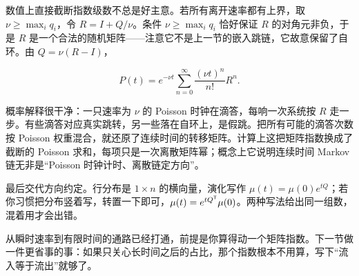 数值上直接截断指数级数不总是好主意。若所有离开速率都有上界，取 \(\nu\ge\max_i q_i\)，令 \(R=I+Q/\nu\)。条件 \(\nu\ge\max_i q_i\) 恰好保证 \(R\) 的对角元非负，于是 \(R\) 是一个合法的随机矩阵——注意它不是上一节的嵌入跳链，它故意保留了自环。由 \(Q=\nu(R-I)\)，

\[
P(t)=e^{-\nu t}\sum_{n=0}^{\infty}\frac{(\nu t)^n}{n!}R^{n}.
\]

概率解释很干净：一只速率为 \(\nu\) 的 Poisson 时钟在滴答，每响一次系统按 \(R\) 走一步。有些滴答对应真实跳转，另一些落在自环上，是假跳。把所有可能的滴答次数按 Poisson 权重混合，就还原了连续时间的转移矩阵。计算上这把矩阵指数换成了截断的 Poisson 求和，每项只是一次离散矩阵幂；概念上它说明连续时间 Markov 链无非是``Poisson 时钟计时、离散链定方向''。

最后交代方向约定。行分布是 \(1\times n\) 的横向量，演化写作 \(\mu(t)=\mu(0)e^{tQ}\)；若你习惯把分布竖着写，转置一下即可，\(\mu(t)=e^{tQ^{\mathsf{T}}}\mu(0)\)。两种写法给出同一组数，混着用才会出错。

从瞬时速率到有限时间的通路已经打通，前提是你算得动一个矩阵指数。下一节做一件更省事的事：如果只关心长时间之后的占比，那个指数根本不用算，写下``流入等于流出''就够了。
